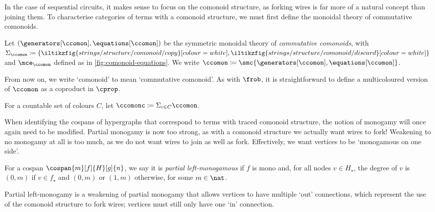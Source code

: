 In the case of sequential circuits, it makes sense to focus on the comonoid
structure, as forking wires is far more of a natural concept than joining them.
To characterise categories of terms with a comonoid structure, we must first
define the monoidal theory of commutative comonoids.

\begin{definition}
    Let \((\generators[\ccomon], \equations[\ccomon])\) be the symmetric
    monoidal theory of \emph{commutative comonoids}, with \(
    \Sigma_{\ccomon} \coloneqq \{
    \iltikzfig{strings/structure/comonoid/copy}[colour=white],
    \iltikzfig{strings/structure/comonoid/discard}[colour=white]
    \}
    \) and \(\mce_{\ccomon}\) defined as in \cref{fig:comonoid-equations}.
    We write \(
    \ccomon \coloneqq \smc{\generators[\ccomon], \equations[\ccomon]}
    \).
\end{definition}



From now on, we write `comonoid' to mean `commutative comonoid'.
As with \(\frob\), it is straightforward to define a multicoloured version of
\(\ccomon\) as a coproduct in \(\cprop\).

\begin{definition}
    For a countable set of colours \(C\), let
    \(\ccomonc \coloneqq \Sigma_{c \in C} \ccomon\).
\end{definition}

When identifying the cospans of hypergraphs that correspond to terms with traced
comonoid structure, the notion of monogamy will once again need to be modified.
Partial monogamy is now too strong, as with a comonoid structure we actually
want wires to fork!
Weakening to no monogamy at all is too much, as we do not want wires to join as
well as fork.
Effectively, we want vertices to be `monogamous on one side'.

\begin{definition}
    For a cospan \(\cospan{m}[f]{H}[g]{n}\), we say it is
    \emph{partial left-monogamous} if \(f\) is mono and, for all nodes
    \(v \in H_\star\), the degree of \(v\) is \((0,m)\) if \(v \in f_\star\) and
    \((0,m)\) or \((1,m)\) otherwise, for some \(m \in \nat\).
\end{definition}

Partial left-monogamy is a weakening of partial monogamy that allows vertices
to have multiple `out' connections, which represent the use of the comonoid
structure to fork wires; vertices must still only have one `in' connection.

